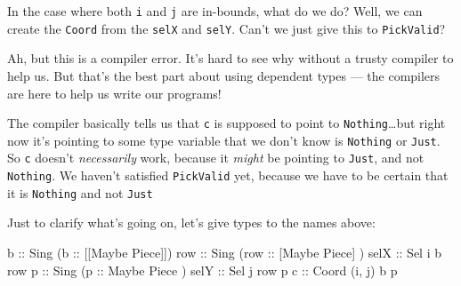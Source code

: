\documentclass[]{article}
\newenvironment{Shaded}{}{}
\newcommand{\DataTypeTok}[1]{\textcolor[rgb]{0.56,0.13,0.00}{#1}}
\newcommand{\KeywordTok}[1]{\textcolor[rgb]{0.00,0.44,0.13}{\textbf{#1}}}
\newcommand{\NormalTok}[1]{#1}
\newcommand{\OperatorTok}[1]{\textcolor[rgb]{0.40,0.40,0.40}{#1}}
\newcommand{\OtherTok}[1]{\textcolor[rgb]{0.00,0.44,0.13}{#1}}
\begin{document}
In the case where both \texttt{i} and \texttt{j} are in-bounds, what do we do?
Well, we can create the \texttt{Coord} from the \texttt{selX} and \texttt{selY}.
Can't we just give this to \texttt{PickValid}?

\begin{Shaded}
\end{Shaded}

Ah, but this is a compiler error. It's hard to see why without a trusty compiler
to help us. But that's the best part about using dependent types --- the
compilers are here to help us write our programs!

The compiler basically tells us that \texttt{c} is supposed to point to
\texttt{\textquotesingle{}Nothing}\ldots but right now it's pointing to some
type variable that we don't know is \texttt{\textquotesingle{}Nothing} or
\texttt{\textquotesingle{}Just}. So \texttt{c} doesn't \emph{necessarily} work,
because it \emph{might} be pointing to \texttt{\textquotesingle{}Just}, and not
\texttt{\textquotesingle{}Nothing}. We haven't satisfied \texttt{PickValid} yet,
because we have to be certain that it is \texttt{\textquotesingle{}Nothing} and
not \texttt{\textquotesingle{}Just}

Just to clarify what's going on, let's give types to the names above:

\begin{Shaded}
\begin{Highlighting}[]
\OtherTok{b    ::} \DataTypeTok{Sing}\NormalTok{ (}\OtherTok{b   ::}\NormalTok{ [[}\DataTypeTok{Maybe} \DataTypeTok{Piece}\NormalTok{]])}
\OtherTok{row  ::} \DataTypeTok{Sing}\NormalTok{ (}\OtherTok{row ::}\NormalTok{  [}\DataTypeTok{Maybe} \DataTypeTok{Piece}\NormalTok{] )}
\OtherTok{selX ::} \DataTypeTok{Sel}\NormalTok{ i b row}
\OtherTok{p    ::} \DataTypeTok{Sing}\NormalTok{ (}\OtherTok{p   ::}   \DataTypeTok{Maybe} \DataTypeTok{Piece}\NormalTok{  )}
\OtherTok{selY ::} \DataTypeTok{Sel}\NormalTok{ j row p}
\OtherTok{c    ::} \DataTypeTok{Coord}\NormalTok{ \textquotesingle{}(i, j) b p}
\end{Highlighting}
\end{Shaded}
\end{document}
